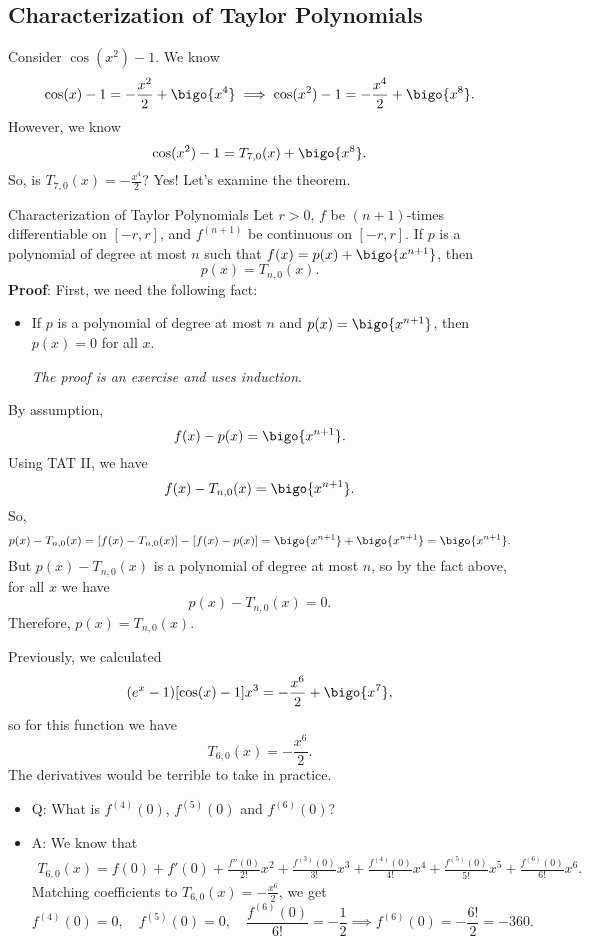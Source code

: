 \subsection*{Characterization of Taylor Polynomials}
Consider $ \cos(x^2)-1 $. We know
\[ \cos(x)-1=-\frac{x^2}{2}+\bigo{x^4}
    \implies \cos(x^2)-1=-\frac{x^4}{2}+\bigo{x^8}. \]
However, we know
\[ \cos(x^2)-1=T_{7,0}(x)+\bigo{x^8}. \]
So, is $ T_{7,0}(x)=-\frac{x^4}{2} $? Yes!
Let's examine the theorem.
\begin{Theorem}{Characterization of Taylor Polynomials}{}
    Let $ r>0 $, $f$ be $ (n+1) $-times differentiable
    on $ [-r,r] $, and $ f^{(n+1)} $ be continuous
    on $ [-r,r] $. If $ p $
    is a polynomial of degree at most $ n $
    such that $ f(x)=p(x)+\bigo{x^{n+1}} $, then
    \[ p(x)=T_{n,0}(x). \]
    \tcblower{}
    \textbf{Proof}: First, we need the following fact:
    \begin{itemize}
        \item If $ p $ is a polynomial of degree
              at most $ n $ and $ p(x)=\bigo{x^{n+1}} $,
              then $ p(x)=0 $ for all $ x $.

              \emph{The proof is an exercise and uses induction}.
    \end{itemize}
    By assumption,
    \[ f(x)-p(x)=\bigo{x^{n+1}}. \]
    Using TAT II, we have
    \[ f(x)-T_{n,0}(x)=\bigo{x^{n+1}}. \]
    So,
    \[ p(x)-T_{n,0}(x)=[f(x)-T_{n,0}(x)]-[f(x)-p(x)]
        =\bigo{x^{n+1}}+\bigo{x^{n+1}}=\bigo{x^{n+1}}. \]
    But $ p(x)-T_{n,0}(x) $
    is a polynomial of degree at most $ n $,
    so by the fact above, for all $ x $ we have
    \[ p(x)-T_{n,0}(x)=0. \]
    Therefore, $ p(x)=T_{n,0}(x) $.
\end{Theorem}
\begin{Example}{}{}
    Previously, we calculated
    \[ (e^x-1)[\cos(x)-1]x^3=-\frac{x^6}{2}+\bigo{x^7}, \]
    so for this function we have
    \[ T_{6,0}(x)=-\frac{x^6}{2}. \]
    The derivatives would be terrible to take in practice.
    \begin{itemize}
        \item Q\@: What is $ f^{(4)}(0) $, $ f^{(5)}(0) $
              and $ f^{(6)}(0) $?
        \item A\@: We know that
              \begin{align*}
                  T_{6,0}(x)=
                  f(0)+f'(0)+
                  \frac{f''(0)}{2!}x^2+
                  \frac{f^{(3)}(0)}{3!}x^3+
                  \frac{f^{(4)}(0)}{4!}x^4+
                  \frac{f^{(5)}(0)}{5!}x^5+
                  \frac{f^{(6)}(0)}{6!}x^6.
              \end{align*}
              Matching coefficients to
              $ T_{6,0}(x)=-\frac{x^6}{2} $, we get
              \[ f^{(4)}(0)=0,\quad f^{(5)}(0)=0,\quad
                  \frac{f^{(6)}(0)}{6!}=-\frac{1}{2}\implies
                  f^{(6)}(0)=-\frac{6!}{2}=-360. \]
    \end{itemize}
\end{Example}